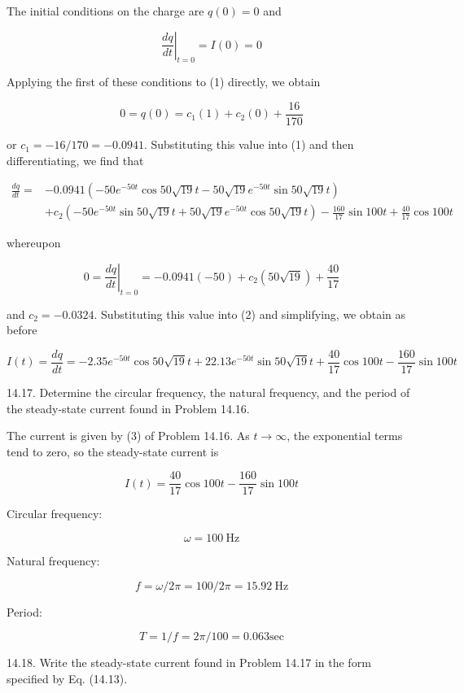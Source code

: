 \documentclass[10pt]{article}
\begin{document}
The initial conditions on the charge are $q(0)=0$ and

$$
\left.\frac{d q}{d t}\right|_{t=0}=I(0)=0
$$

Applying the first of these conditions to (1) directly, we obtain

$$
0=q(0)=c_{1}(1)+c_{2}(0)+\frac{16}{170}
$$

or $c_{1}=-16 / 170=-0.0941$. Substituting this value into (1) and then differentiating, we find that


\begin{align*}
\frac{d q}{d t}= & -0.0941\left(-50 e^{-50 t} \cos 50 \sqrt{19} t-50 \sqrt{19} e^{-50 t} \sin 50 \sqrt{19} t\right) \\
& +c_{2}\left(-50 e^{-50 t} \sin 50 \sqrt{19} t+50 \sqrt{19} e^{-50 t} \cos 50 \sqrt{19} t\right)-\frac{160}{17} \sin 100 t+\frac{40}{17} \cos 100 t \tag{2}
\end{align*}


whereupon

$$
0=\left.\frac{d q}{d t}\right|_{t=0}=-0.0941(-50)+c_{2}(50 \sqrt{19})+\frac{40}{17}
$$

and $c_{2}=-0.0324$. Substituting this value into (2) and simplifying, we obtain as before


\begin{equation*}
I(t)=\frac{d q}{d t}=-2.35 e^{-50 t} \cos 50 \sqrt{19} t+22.13 e^{-50 t} \sin 50 \sqrt{19} t+\frac{40}{17} \cos 100 t-\frac{160}{17} \sin 100 t \tag{3}
\end{equation*}


14.17. Determine the circular frequency, the natural frequency, and the period of the steady-state current found in Problem 14.16.

The current is given by (3) of Problem 14.16. As $t \rightarrow \infty$, the exponential terms tend to zero, so the steady-state current is

$$
I(t)=\frac{40}{17} \cos 100 t-\frac{160}{17} \sin 100 t
$$

Circular frequency:

$$
\omega=100 \mathrm{~Hz}
$$

Natural frequency:

$$
f=\omega / 2 \pi=100 / 2 \pi=15.92 \mathrm{~Hz}
$$

Period:

$$
T=1 / f=2 \pi / 100=0.063 \mathrm{sec}
$$

14.18. Write the steady-state current found in Problem 14.17 in the form specified by Eq. (14.13).
\end{document}
